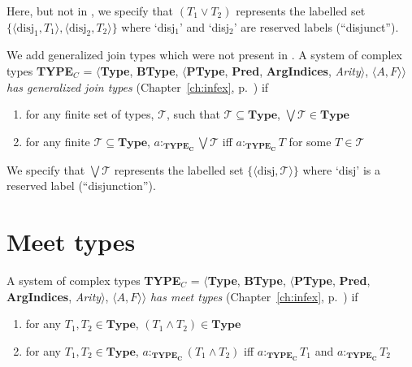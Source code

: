 Here, but not in \cite{Cooper2012}, we specify that $(T_1\vee T_2)$
represents the labelled set
$\{\langle\mathrm{disj}_1,T_1\rangle,\langle\mathrm{disj_2},T_2\rangle\}$
where `disj$_1$' and `disj$_2$' are reserved labels (``disjunct'').

We add generalized join types which were not present in
\cite{Cooper2012}.  A system of complex types {\bf TYPE$_C$} = $\langle${\bf Type}, {\bf BType},
$\langle$\textbf{PType}, {\bf Pred}, \textbf{ArgIndices}, {\it
  Arity\/}$\rangle$, $\langle A,F\rangle$$\rangle$ \textit{has
  generalized join
  types} (Chapter~\ref{ch:infex}, p.~\pageref{ex:genjointypes}) if 

\begin{enumerate} 
 
\item for any finite set of types, $\mathscr{T}$, such that $\mathscr{T}
  \subseteq\mathbf{Type}$, $\bigvee\mathscr{T} \in \mathbf{Type}$ 
 
\item for any finite $\mathscr{T} \subseteq\mathbf{Type}$, $a:_{\mathbf{TYPE_C}}\bigvee\mathscr{T}$ iff
  $a:_{\mathbf{TYPE_C}}T$ for some $T\in\mathscr{T}$
 
\end{enumerate}

We specify that $\bigvee\mathscr{T}$
represents the labelled set
$\{\langle\mathrm{disj},\mathscr{T}\rangle\}$
where `disj' is a reserved label (``disjunction'').

\section{Meet types}
\label{app:meettypes}

A system of complex types \textbf{TYPE}$_C$ = $\langle${\bf Type}, {\bf BType},
$\langle$\textbf{PType}, {\bf Pred}, \textbf{ArgIndices}, {\it
  Arity\/}$\rangle$, $\langle A,F\rangle$$\rangle$ \textit{has meet
  types} (Chapter~\ref{ch:infex}, p.~\pageref{ex:meettypes}) if
\begin{enumerate} 
 
\item for any $T_1,T_2 \in \mathbf{Type}$, $(T_1\wedge T_2) \in \mathbf{Type}$ 
 
\item for any $T_1,T_2 \in \mathbf{Type}$, $a:_{\mathbf{TYPE_C}}(T_1\wedge T_2)$ iff
  $a:_{\mathbf{TYPE_C}}T_1$ and $a:_{\mathbf{TYPE_C}}T_2$ 

\end{enumerate}

